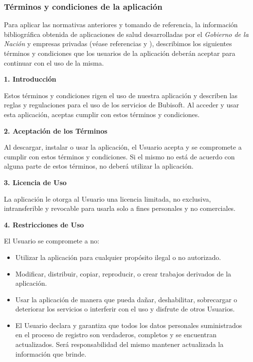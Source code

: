 \documentclass[a4paper,12pt]{article}
\newcommand{\saltolinea}{\par\vspace{\baselineskip}}
\begin{document}
    \subsubsection{Términos y condiciones de la aplicación}
    \par Para aplicar las normativas anteriores y tomando de referencia, la información bibliográfica obtenida de aplicaciones de salud desarrolladas por el \textit{Gobierno de la Nación} \cite{TerminosCondiciones1} y empresas privadas (véase referencias \cite{TerminosCondiciones2} y \cite{TerminosCondiciones3}), describimos los siguientes términos y condiciones que los usuarios de la aplicación deberán aceptar para continuar con el uso de la misma. 
    \saltolinea
    \par \textbf{1. Introducción} 
    \saltolinea
    \par Estos términos y condiciones rigen el uso de nuestra aplicación y describen las reglas y regulaciones para el uso de los servicios de Bubisoft. Al acceder y usar esta aplicación, aceptas cumplir con estos términos y condiciones.
    \saltolinea
    \par \textbf{2. Aceptación de los Términos} 
    \saltolinea
    \par Al descargar, instalar o usar la aplicación, el Usuario acepta y se compromete a cumplir con estos términos y condiciones. Si el mismo no está de acuerdo con alguna parte de estos términos, no deberá utilizar la aplicación. 
    \saltolinea
    \par \textbf{3. Licencia de Uso} 
    \saltolinea
    \par La aplicación le otorga al Usuario una licencia limitada, no exclusiva, intransferible y revocable para usarla solo a fines personales y no comerciales. 
    \saltolinea
    \par \textbf{4. Restricciones de Uso} 
    \saltolinea
    \par El Usuario se compromete a no:
    \begin{itemize}
        \item Utilizar la aplicación para cualquier propósito ilegal o no autorizado.
        \item Modificar, distribuir, copiar, reproducir, o crear trabajos derivados de la aplicación. 
        \item Usar la aplicación de manera que pueda dañar, deshabilitar, sobrecargar o deteriorar los servicios o interferir con el uso y disfrute de otros Usuarios. 
        \item El Usuario declara y garantiza que todos los datos personales suministrados en el proceso de registro son verdaderos, completos y se encuentran actualizados. Será responsabilidad del mismo mantener actualizada la información que brinde.
    \end{itemize}
\end{document}
